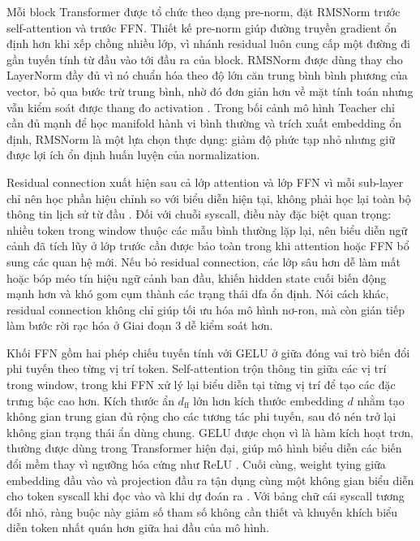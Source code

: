 \documentclass[../main.tex]{subfiles}
\begin{document}
Mỗi block Transformer được tổ chức theo dạng pre-norm, đặt RMSNorm
trước self-attention
và trước FFN. Thiết kế pre-norm giúp đường truyền gradient ổn định
hơn khi xếp chồng
nhiều lớp, vì nhánh residual luôn cung cấp một đường đi gần tuyến
tính từ đầu vào tới
đầu ra của block. RMSNorm được dùng thay cho LayerNorm đầy đủ vì nó
chuẩn hóa theo độ
lớn căn trung bình bình phương của vector, bỏ qua bước trừ trung
bình, nhờ đó đơn giản
hơn về mặt tính toán nhưng vẫn kiểm soát được thang đo activation
\cite{zhang2019rmsnorm}.
Trong bối cảnh mô hình Teacher chỉ cần đủ mạnh để học manifold hành
vi bình thường và
trích xuất embedding ổn định, RMSNorm là một lựa chọn thực dụng: giảm
độ phức tạp nhỏ
nhưng giữ được lợi ích ổn định huấn luyện của normalization.

Residual connection xuất hiện sau cả lớp attention và lớp FFN vì mỗi
sub-layer chỉ nên
học phần hiệu chỉnh so với biểu diễn hiện tại, không phải học lại
toàn bộ thông tin
lịch sử từ đầu \cite{he2016resnet}. Đối với chuỗi \gls{syscall}, điều này
đặc biệt quan
trọng: nhiều token trong window thuộc các mẫu bình thường lặp lại,
nên biểu diễn ngữ
cảnh đã tích lũy ở lớp trước cần được bảo toàn trong khi attention
hoặc FFN bổ sung các
quan hệ mới. Nếu bỏ residual connection, các lớp sâu hơn dễ làm mất
hoặc bóp méo tín
hiệu ngữ cảnh ban đầu, khiến hidden state cuối biến động mạnh hơn và
khó gom cụm thành
các trạng thái \gls{dfa} ổn định. Nói cách khác, residual connection không
chỉ giúp tối ưu hóa
mô hình nơ-ron, mà còn gián tiếp làm bước rời rạc hóa ở Giai đoạn 3
dễ kiểm soát hơn.

Khối FFN gồm hai phép chiếu tuyến tính với GELU ở giữa đóng vai trò
biến đổi phi tuyến
theo từng vị trí token. Self-attention trộn thông tin giữa các vị trí
trong window,
trong khi FFN xử lý lại biểu diễn tại từng vị trí để tạo các đặc
trưng bậc cao hơn.
Kích thước ẩn $d_{\text{ff}}$ lớn hơn kích thước embedding
$d$ nhằm tạo không
gian trung gian đủ rộng cho các tương tác phi tuyến, sau đó nén trở
lại không gian
trạng thái ẩn dùng chung. GELU được chọn vì là hàm kích hoạt trơn,
thường được dùng
trong Transformer hiện đại, giúp mô hình biểu diễn các biến đổi mềm
thay vì ngưỡng hóa
cứng như ReLU \cite{hendrycks2016gelu}. Cuối cùng, weight tying giữa
embedding đầu vào
và projection đầu ra tận dụng cùng một không gian biểu diễn cho token
\gls{syscall} khi đọc
vào và khi dự đoán ra \cite{press2017using}. Với bảng chữ cái \gls{syscall}
tương đối nhỏ,
ràng buộc này giảm số tham số không cần thiết và khuyến khích biểu
diễn token nhất quán
hơn giữa hai đầu của mô hình.
\end{document}

